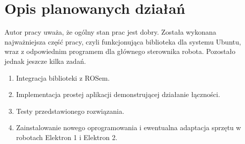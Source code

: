 \documentclass[10pt,a4paper]{article}
\begin{document}
	\section{Opis planowanych działań}
	Autor pracy uważa, że ogólny stan prac jest dobry. Została wykonana najważniejsza część pracy, czyli funkcjonująca biblioteka dla systemu Ubuntu, wraz z odpowiednim programem dla głównego sterownika robota. Pozostało jednak jeszcze kilka zadań.
	\begin{enumerate}
		\item Integracja biblioteki z ROSem.
		\item Implementacja prostej aplikacji demonstrującej działanie łączności.
		\item Testy przedstawionego rozwiązania. 
		\item Zainstalowanie nowego oprogramowania i ewentualna adaptacja sprzętu w robotach Elektron 1 i Elektron 2. \
	\end{enumerate}
	 
	
	\nocite{*}
\end{document}
